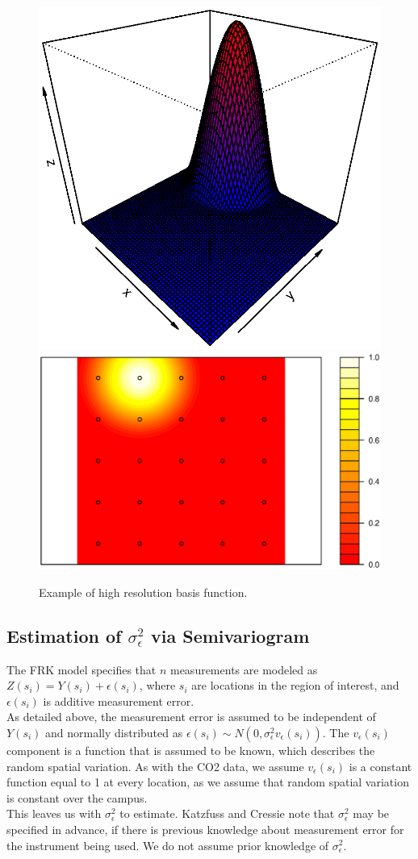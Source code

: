 \documentclass[11pt]{article}
\begin{document}
\begin{figure}[H]
\centering
\includegraphics[width=0.55\columnwidth]{./Images/res3}
\includegraphics[width=0.44\columnwidth]{./Images/res31}
\caption{Example of high resolution basis function.}
\label{fig:res3}
\end{figure}

\subsection{Estimation of $\sigma^2_{\epsilon}$ via Semivariogram}

The FRK model specifies that $n$ measurements are modeled as $Z(s_i) = Y(s_i) + \epsilon(s_i)$, where $s_i$ are locations in the region of interest, and $\epsilon(s_i)$ is additive measurement error.\\

As detailed above, the measurement error is assumed to be independent of $Y(s_i)$ and normally distributed as $\epsilon(s_i) \sim N(0,\sigma^2_\epsilon v_\epsilon (s_i))$.  The $v_\epsilon (s_i)$ component is a function that is assumed to be known, which describes the random spatial variation.  As with the CO2 data, we assume $v_\epsilon (s_i)$ is a constant function equal to 1 at every location, as we assume that random spatial variation is constant over the campus. \\

This leaves us with $\sigma^2_\epsilon$ to estimate. Katzfuss and Cressie note that $\sigma^2_\epsilon$ may be specified in advance, if there is previous knowledge about measurement error for the instrument being used.  We do not assume prior knowledge of $\sigma^2_\epsilon$. \\
\end{document}
